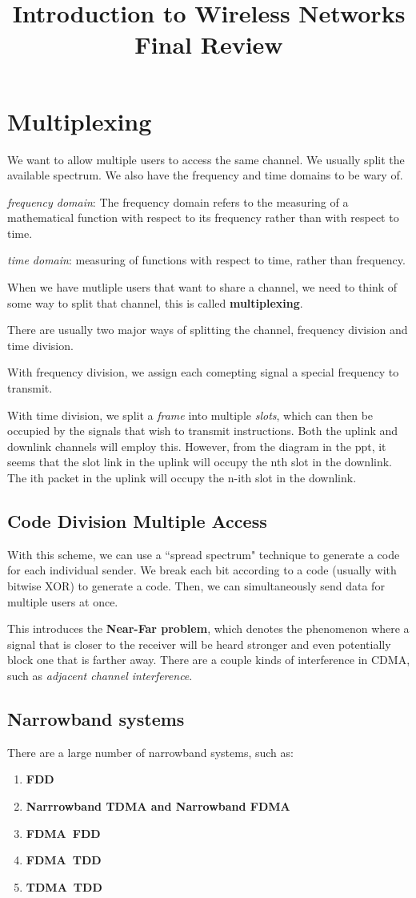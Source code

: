 \documentclass{article}
\title{Introduction to Wireless Networks Final Review}
\begin{document}
\section{Multiplexing}
We want to allow multiple users to access the same channel. We usually split the
available spectrum. We also have the frequency and time domains to be wary of. 

\textit{frequency domain}: The frequency domain refers to the measuring of a 
mathematical function with respect to its frequency rather than with respect to time.

\textit{time domain}: measuring of functions with respect to time, rather than frequency. 

When we have mutliple users that want to share a channel, we need to think of some way to 
split that channel, this is called \textbf{multiplexing}.

There are usually two major ways of splitting the channel, frequency division and time division.

With frequency division, we assign each comepting signal a special frequency to transmit.

With time division, we split a \textit{frame} into multiple \textit{slots}, which can then be 
occupied by the signals that wish to transmit instructions. Both the uplink and downlink channels
will employ this. However, from the diagram in the ppt, it seems that the slot link in the 
uplink will occupy the nth slot in the downlink. The ith packet in the uplink will occupy the 
n-ith slot in the downlink.

\subsection{Code Division Multiple Access}
With this scheme, we can  use a ``spread spectrum" technique to generate a code for each individual
sender. We break each bit according to a code (usually with bitwise XOR) to generate a code. Then,
we can simultaneously send data for multiple users at once. 

This introduces the \textbf{Near-Far problem}, which denotes the phenomenon where a signal that is
closer to the receiver will be heard stronger and even potentially block one that is farther away. There
are a couple kinds of interference in CDMA, such as \textit{adjacent channel interference}.

\subsection{Narrowband systems}
There are a large number of narrowband systems, such as:
\begin{enumerate}
		\item{\textbf{FDD}}
		\item{\textbf{Narrrowband TDMA and Narrowband FDMA}}
		\item{\textbf{FDMA\ FDD}}
		\item{\textbf{FDMA\ TDD}}
		\item{\textbf{TDMA\ TDD}}
\end{enumerate}
\end{document}
